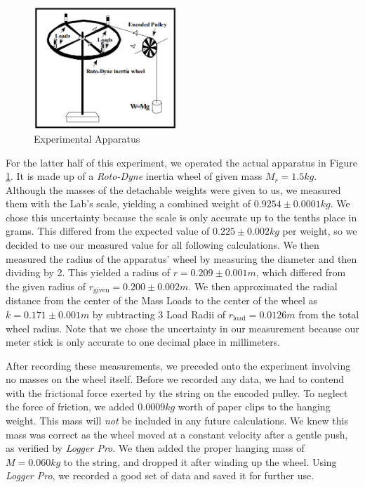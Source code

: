 \documentclass[12pt]{article}
\begin{document}
\begin{figure}
  \begin{center}
    \includegraphics[width=0.48\textwidth]{Experimental Apparatus.png}
  \end{center}
  \caption{Experimental Apparatus}
  \label{apparatus}
\end{figure}

For the latter half of this experiment, we operated the actual apparatus in Figure \ref{apparatus}. It is made up of a \textit{Roto-Dyne} inertia wheel of given mass $M_r=1.5kg$. Although the masses of the detachable weights were given to us, we measured them with the Lab's scale, yielding a combined weight of $0.9254\pm 0.0001kg$. We chose this uncertainty because the scale is only accurate up to the tenths place in grams. This differed from the expected value of $0.225\pm0.002kg$ per weight, so we decided to use our measured value for all following calculations. We then measured the radius of the apparatus' wheel by measuring the diameter and then dividing by 2. This yielded a radius of $r=0.209\pm0.001m$, which differed from the given radius of $r_{\text{given}}=0.200\pm0.002m$. We then approximated the radial distance from the center of the Mass Loads to the center of the wheel as $k=0.171\pm0.001m$ by subtracting 3 Load Radii of $r_{\text{load}}=0.0126m$ from the total wheel radius. Note that we chose the uncertainty in our measurement because our meter stick is only accurate to one decimal place in millimeters. \par

After recording these measurements, we preceded onto the experiment involving no masses on the wheel itself. Before we recorded any data, we had to contend with the frictional force exerted by the string on the encoded pulley. To neglect the force of friction, we added $0.0009kg$ worth of paper clips to the hanging weight. This mass will \textit{not} be included in any future calculations. We knew this mass was correct as the wheel moved at a constant velocity after a gentle push, as verified by \textit{Logger Pro}. We then added the proper hanging mass of $M=0.060kg$ to the string, and dropped it after winding up the wheel. Using \textit{Logger Pro}, we recorded a good set of data and saved it for further use. \par
\end{document}
